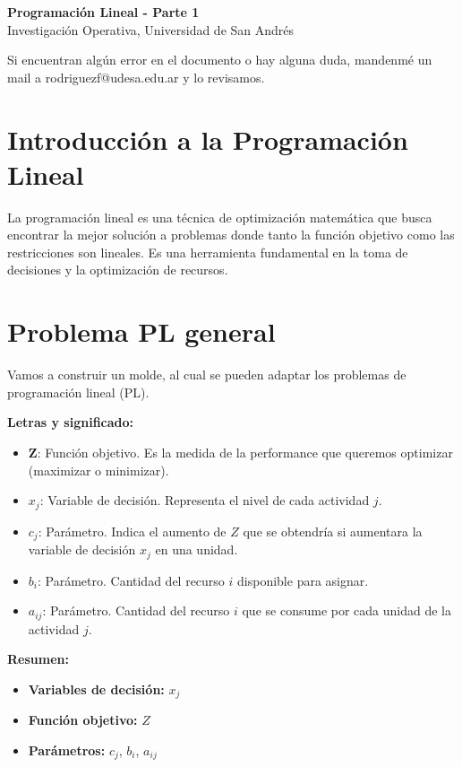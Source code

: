 \documentclass[12pt]{article}
\begin{document}
\begin{center}
  {\LARGE \textbf{Programación Lineal - Parte 1}}\\[0.5em]
  {Investigación Operativa, Universidad de San Andrés}
\end{center}

Si encuentran algún error en el documento o hay alguna duda, mandenmé un mail a rodriguezf@udesa.edu.ar y lo revisamos.

\section{Introducción a la Programación Lineal}
La programación lineal es una técnica de optimización matemática que busca encontrar la mejor solución a problemas donde tanto la función objetivo como las restricciones son lineales. Es una herramienta fundamental en la toma de decisiones y la optimización de recursos.

\section{Problema PL general}

Vamos a construir un molde, al cual se pueden adaptar los problemas de programación lineal (PL).

\vspace{1em}

\textbf{Letras y significado:}

\begin{itemize}
    \item $\mathbf{Z}$: Función objetivo. Es la medida de la performance que queremos optimizar (maximizar o minimizar).
    \item $x_j$: Variable de decisión. Representa el nivel de cada actividad $j$.
    \item $c_j$: Parámetro. Indica el aumento de $Z$ que se obtendría si aumentara la variable de decisión $x_j$ en una unidad.
    \item $b_i$: Parámetro. Cantidad del recurso $i$ disponible para asignar.
    \item $a_{ij}$: Parámetro. Cantidad del recurso $i$ que se consume por cada unidad de la actividad $j$.
\end{itemize}

\vspace{1em}

\textbf{Resumen:}

\begin{itemize}
    \item \textbf{Variables de decisión:} $x_j$
    \item \textbf{Función objetivo:} $Z$
    \item \textbf{Parámetros:} $c_j$, $b_i$, $a_{ij}$
\end{itemize}
\end{document}
